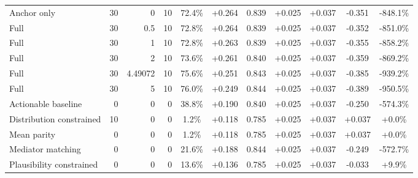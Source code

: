 \begin{table}[htbp]
\begin{tabular}{lrrrccccccc}
Anchor only & 30 & 0 & 10 & 72.4\% & +0.264 & 0.839 & +0.025 & +0.037 & -0.351 & -848.1\% \\
Full & 30 & 0.5 & 10 & 72.8\% & +0.264 & 0.839 & +0.025 & +0.037 & -0.352 & -851.0\% \\
Full & 30 & 1 & 10 & 72.8\% & +0.263 & 0.839 & +0.025 & +0.037 & -0.355 & -858.2\% \\
Full & 30 & 2 & 10 & 73.6\% & +0.261 & 0.840 & +0.025 & +0.037 & -0.359 & -869.2\% \\
Full & 30 & 4.49072 & 10 & 75.6\% & +0.251 & 0.843 & +0.025 & +0.037 & -0.385 & -939.2\% \\
Full & 30 & 5 & 10 & 76.0\% & +0.249 & 0.844 & +0.025 & +0.037 & -0.389 & -950.5\% \\
Actionable baseline & 0 & 0 & 0 & 38.8\% & +0.190 & 0.840 & +0.025 & +0.037 & -0.250 & -574.3\% \\
Distribution constrained & 10 & 0 & 0 & 1.2\% & +0.118 & 0.785 & +0.025 & +0.037 & +0.037 & +0.0\% \\
Mean parity & 0 & 0 & 0 & 1.2\% & +0.118 & 0.785 & +0.025 & +0.037 & +0.037 & +0.0\% \\
Mediator matching & 0 & 0 & 0 & 21.6\% & +0.188 & 0.844 & +0.025 & +0.037 & -0.249 & -572.7\% \\
Plausibility constrained & 0 & 0 & 0 & 13.6\% & +0.136 & 0.785 & +0.025 & +0.037 & -0.033 & +9.9\% \\
\bottomrule
\end{tabular}
\end{table}